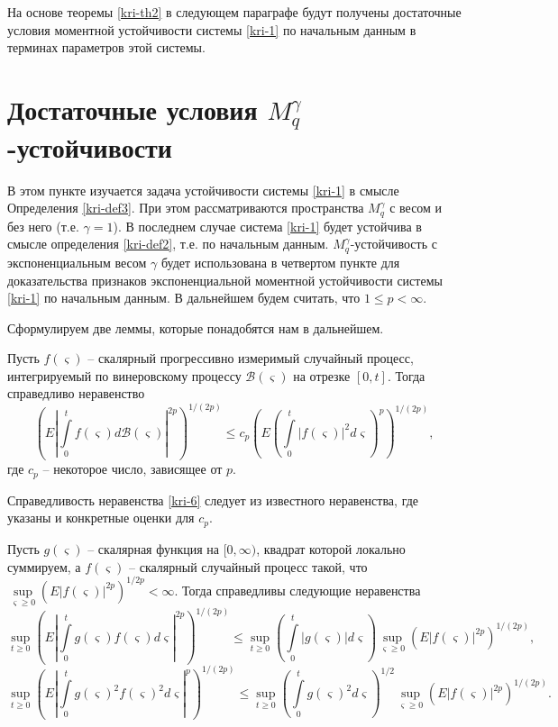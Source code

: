 На основе теоремы \ref{kri-th2} в следующем параграфе будут получены достаточные
условия моментной устойчивости системы \eqref{kri-1} по начальным данным в
терминах параметров этой системы.

\section{Достаточные условия \texorpdfstring{$M_q^\gamma$}{Mq}-устойчивости} 

В этом
пункте изучается задача устойчивости системы \eqref{kri-1} в смысле
Определения \ref{kri-def3}. При этом рассматриваются пространства  $M_q^\gamma$ с
весом и без него (т.е. $\gamma=1$). В последнем случае система \eqref{kri-1}
будет устойчива в смысле определения \ref{kri-def2}, т.е. по начальным данным.
$M_q^\gamma$-устойчивость с экспоненциальным весом $\gamma$ будет
использована в четвертом пункте для доказательства признаков
экспоненциальной моментной устойчивости системы \eqref{kri-1} по начальным
данным. В дальнейшем будем считать, что $1 \leq p < \infty $.

Сформулируем две леммы, которые понадобятся нам в дальнейшем.

\begin{lemma}\label{kri-lem2} Пусть $f(\varsigma )$ -- скалярный прогрессивно
измеримый  случайный процесс, интегрируемый по винеровскому процессу
$\mathcal B(\varsigma)$ на отрезке $[0, t]$. Тогда справедливо
неравенство
\begin{equation}\label{kri-6}
\left(E\left|\int \limits _0^tf(\varsigma )d\mathcal B(\varsigma
)\right|^{2p}\right)^{1/(2p)} \leq c_p \left(E\left(\int \limits
_0^t|f(\varsigma )|^2d\varsigma\right)^p\right)^{1/(2p)},
\end{equation}
где $c_p$ -- некоторое число, зависящее от $p$.
\end{lemma}

Справедливость неравенства \eqref{kri-6} следует из известного неравенства,
где указаны и конкретные оценки для $c_p$.

\begin{lemma}\label{kri-lem3} Пусть $g(\varsigma)$ -- скалярная функция на $[0,
\infty)$, квадрат которой локально суммируем, а $f(\varsigma)$ --
скалярный случайный процесс такой, что $\sup \limits _{\varsigma
\geq 0}(E|f(\varsigma )|^{2p})^{1/2p} < \infty$. Тогда справедливы
следующие неравенства
\begin{equation}\label{kri-7}
\sup \limits _{t \geq 0}\left(E\left|\int \limits
_0^tg(\varsigma)f(\varsigma)d\varsigma\right|^{2p}\right)^{1/(2p)}
\leq \sup \limits _{t \geq 0}\left(\int \limits
_0^t|g(\varsigma)|d\varsigma\right)\sup \limits _{\varsigma \geq
0}\left(E\left|f(\varsigma)\right|^{2p}\right)^{1/(2p)},
\end{equation}
\begin{equation}\label{kri-8}
\sup \limits _{t \geq 0}\left(E|\int \limits
_0^tg(\varsigma)^2f(\varsigma)^2d\varsigma|^{p}\right)^{1/(2p)} \leq
\sup \limits _{t \geq 0}\left(\int \limits
_0^tg(\varsigma)^2d\varsigma\right)^{1/2}\sup \limits _{\varsigma
\geq 0}\left(E\left|f(\varsigma)\right|^{2p}\right)^{1/(2p)}.
\end{equation}
\end{lemma}

